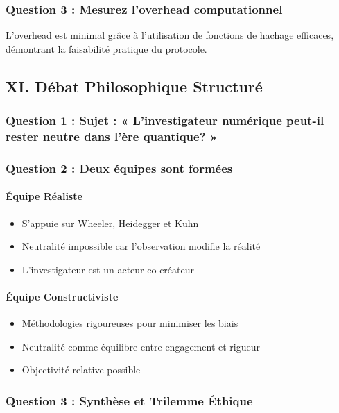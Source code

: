 \documentclass[12pt, a4paper]{article}
\begin{document}
		\subsubsection*{Question 3 : Mesurez l'overhead computationnel}
		
		L'overhead est minimal grâce à l'utilisation de fonctions de hachage efficaces, démontrant la faisabilité pratique du protocole.
		
		\subsection*{XI. Débat Philosophique Structuré}
		
		\subsubsection*{Question 1 : Sujet : « L'investigateur numérique peut-il rester neutre dans l'ère quantique? »}
		
		\subsubsection*{Question 2 : Deux équipes sont formées}
		
		\paragraph{Équipe Réaliste}
		\begin{itemize}
			\item S'appuie sur Wheeler, Heidegger et Kuhn
			\item Neutralité impossible car l'observation modifie la réalité
			\item L'investigateur est un acteur co-créateur
		\end{itemize}
		
		\paragraph{Équipe Constructiviste}
		\begin{itemize}
			\item Méthodologies rigoureuses pour minimiser les biais
			\item Neutralité comme équilibre entre engagement et rigueur
			\item Objectivité relative possible
		\end{itemize}
		
		\subsubsection*{Question 3 : Synthèse et Trilemme Éthique}
		
\end{document}
